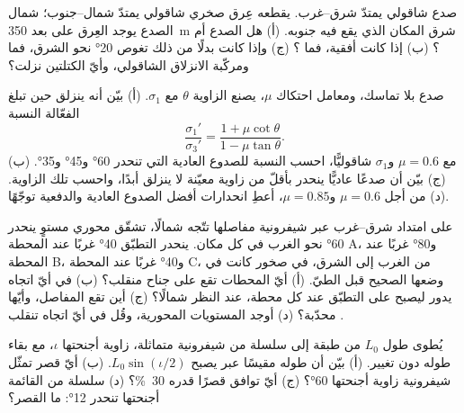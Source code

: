 \begin{exercise}[$\star\star$]\label{exo:b1:faults-folds-fabrics:9}
صدع شاقولي يمتدّ شرق--غرب. يقطعه عِرق صخري شاقولي يمتدّ شمال--جنوب؛ شمال الصدع يوجد العِرق على بعد \qty{350}{m} شرق المكان الذي يقع فيه جنوبه. (أ) هل الصدع  أم ؟ (ب) إذا كانت  أفقية، فما ؟ (ج) وإذا كانت بدلًا من ذلك تغوص \ang{20} نحو الشرق، فما  ومركّبة الانزلاق الشاقولي، وأيّ الكتلتين نزلت؟
\end{exercise}

\begin{exercise}[$\star\star\star$]\label{exo:b1:faults-folds-fabrics:10}
صدع بلا تماسك، ومعامل احتكاك $\mu$، يصنع الزاوية $\theta$ مع $\sigma_1$. (أ) بيّن أنه ينزلق حين تبلغ  الفعّالة النسبة
\[
  \frac{\sigma_1'}{\sigma_3'} = \frac{1 + \mu\cot\theta}{1 - \mu\tan\theta} .
\]
(ب) مع $\mu = 0.6$ و$\sigma_1$ شاقوليًّا، احسب النسبة للصدوع العادية التي تنحدر \ang{60} و\ang{45} و\ang{35}. (ج) بيّن أن صدعًا عاديًّا ينحدر بأقلّ من زاوية معيّنة لا ينزلق أبدًا، واحسب تلك الزاوية. (د) من أجل $\mu = 0.6$ و$\mu = 0.85$، أعطِ انحدارات أفضل الصدوع العادية والدفعية توجّهًا.
\end{exercise}

\begin{exercise}[$\star\star\star$]\label{exo:b1:faults-folds-fabrics:11}
على امتداد شرق--غرب عبر  شيفرونية مفاصلها تتّجه شمالًا، تشقّق محوري مستوٍ ينحدر \ang{60} نحو الغرب في كل مكان. ينحدر التطبّق \ang{40} غربًا عند المحطة A، و\ang{80} غربًا عند المحطة B، و\ang{40} غربًا عند المحطة C، من الغرب إلى الشرق، في صخور كانت في وضعها الصحيح قبل الطيّ. (أ) أيّ المحطات تقع على جناح منقلب؟ (ب) في أيّ اتجاه يدور  ليصبح على التطبّق عند كل محطة، عند النظر شمالًا؟ (ج) أين تقع المفاصل، وأيّها  محدّبة؟ (د) أوجد   المستويات المحورية، وقُل في أيّ اتجاه تنقلب .
\end{exercise}

\begin{exercise}[$\star\star\star$]\label{exo:b1:faults-folds-fabrics:12}
يُطوى طول $L_0$ من طبقة إلى سلسلة من  شيفرونية متماثلة، زاوية أجنحتها $\iota$، مع بقاء طوله دون تغيير. (أ) بيّن أن طوله مقيسًا عبر  يصبح $L_0\sin(\iota/2)$. (ب) أيّ قصر تمثّل  شيفرونية زاوية أجنحتها \ang{60}؟ (ج) أيّ  توافق قصرًا قدره \qty{30}{\percent}؟ (د) سلسلة من  القائمة أجنحتها تنحدر \ang{12}: ما القصر؟
\end{exercise}

